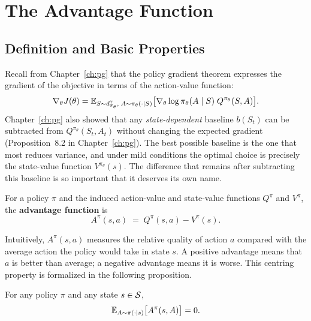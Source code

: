 \section{The Advantage Function}
\label{sec:advantage}

\subsection{Definition and Basic Properties}

Recall from Chapter~\ref{ch:pg} that the policy gradient theorem
expresses the gradient of the objective in terms of the action-value function:
\begin{equation}
\label{eq:pg-theorem-repeat}
\nabla_\theta J(\theta)
= \operatorname{\mathbb{E}}_{S \sim d^\gamma_{\pi_\theta},\; A \sim \pi_\theta(\cdot|S)}
  \bigl[\nabla_\theta \log \pi_\theta(A \mid S)\; Q^{\pi_\theta}(S, A)\bigr].
\end{equation}
Chapter~\ref{ch:pg} also showed that any \emph{state-dependent} baseline
$b(S_t)$ can be subtracted from $Q^{\pi_\theta}(S_t, A_t)$ without
changing the expected gradient (Proposition~8.2 in Chapter~\ref{ch:pg}).
The best possible baseline is the one that most reduces variance, and
under mild conditions the optimal choice is precisely the state-value function
$V^{\pi_\theta}(s)$.  The difference that remains after subtracting this
baseline is so important that it deserves its own name.

\begin{definition}
\label{def:advantage}
For a policy $\pi$ and the induced action-value and state-value functions
$Q^\pi$ and $V^\pi$, the \textbf{advantage function} is
\begin{equation}
\label{eq:advantage-def}
A^\pi(s, a) \;=\; Q^\pi(s, a) - V^\pi(s).
\end{equation}
\end{definition}

Intuitively, $A^\pi(s,a)$ measures the relative quality of action $a$ compared
with the average action the policy would take in state $s$.  A positive
advantage means that $a$ is better than average; a negative advantage means
it is worse.  This centring property is formalized in the following proposition.

\begin{proposition}
\label{prop:advantage-zero-mean}
For any policy $\pi$ and any state $s \in \mathcal{S}$,
\begin{equation}
\label{eq:advantage-zero-mean}
\operatorname{\mathbb{E}}_{A \sim \pi(\cdot|s)}\bigl[A^\pi(s, A)\bigr] = 0.
\end{equation}
\end{proposition}

